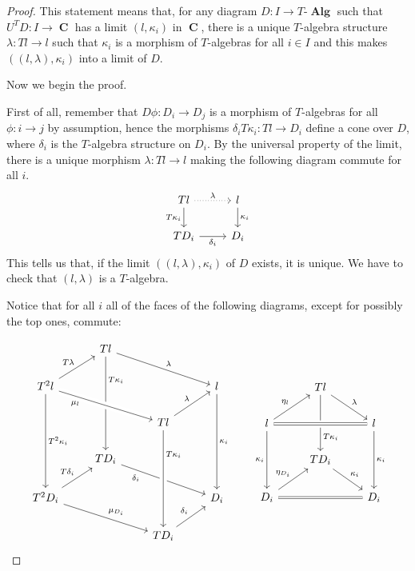 \documentclass[a4paper,11pt,twoside, openany]{book}
\DeclareMathOperator{\Alg}{\mathbf{Alg}}
\DeclareMathOperator{\C}{\mathbf{C}}
\theoremstyle{definition}
\theoremstyle{definition}
\theoremstyle{remark}
\begin{document}
\begin{proof}
	This statement means that, for any diagram $D\colon I\rightarrow T\mbox{-}\Alg$ such that $U^TD\colon I\rightarrow\C$ has a limit $(l,\kappa_i)$ in $\C$, there is a unique $T$-algebra structure $\lambda\colon Tl\rightarrow l$ such that $\kappa_i$ is a morphism of $T$-algebras for all $i\in I$ and this makes $((l,\lambda),\kappa_i)$ into a limit of $D$.
	
	Now we begin the proof.
	
	First of all, remember that $D\phi\colon D_i\rightarrow D_j$ is a morphism of $T$-algebras for all $\phi\colon i\rightarrow j$ by assumption, hence the morphisms $\delta_i T\kappa_i\colon Tl\rightarrow D_i$ define a cone over $D$, where $\delta_i$ is the $T$-algebra structure on $D_i$. By the universal property of the limit, there is a unique morphism $\lambda\colon Tl\rightarrow l$ making the following diagram commute for all $i$.
	\[
		\begin{tikzcd}
			Tl\ar[d, "T\kappa_i"']\ar[r, dotted, "\lambda"]
			& l\ar[d, "\kappa_i"] \\
			TD_i\ar[r, "\delta_i"']
			& D_i
		\end{tikzcd}
	\]	
	This tells us that, if the limit $((l,\lambda),\kappa_i)$ of $D$ exists, it is unique. We have to check that $(l,\lambda)$ is a $T$-algebra.
	
	Notice that for all $i$ all of the faces of the following diagrams, except for possibly the top ones, commute:
	
	\[
		\begin{tikzcd}
			& Tl\ar[drr, "\lambda"]\ar[ddd, "T\kappa_i" near start] \\
			T^2l\ar[ur, "T\lambda"]\ar[drr, crossing over, "\mu_l" near start, swap]\ar[ddd, "T^2\kappa_i"]
			&&& l\ar[ddd, "\kappa_i"] \\
			&& Tl\ar[ur, "\lambda"]%
			\\
			& TD_i\ar[drr, swap, "\delta_i" near start] \\
			T^2D_i\ar[ur, "T\delta_i"]\ar[drr, "\mu_{D_i}"]
			&&& D_i \\
			&& TD_i\ar[ur, "\delta_i"] \ar[from=uuu,crossing over,  "T\kappa_i" near start]
		\end{tikzcd}
		\quad\quad
		\begin{tikzcd}
			& Tl\ar[dr, "\lambda"]\ar[dd, "T\kappa_i" near end] \\
			l\ar[ur, "\eta_l"]\ar[rr, crossing over, equal]\ar[dd, swap, "\kappa_i"]
			&& l\ar[dd, "\kappa_i"] \\
			& TD_i\ar[dr, "\kappa_i"] \\
			D_i\ar[ur, "\eta_{D_i}"]\ar[rr, equal]
			&& D_i
		\end{tikzcd}
	\]
	

\end{proof}
\end{document}
